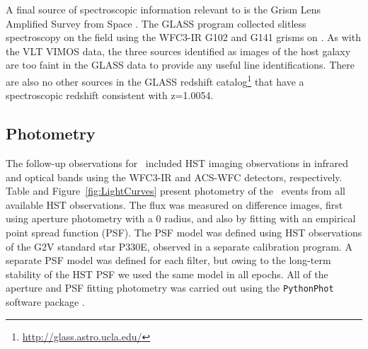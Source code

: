 A final source of spectroscopic information relevant to \spock
is the Grism Lens Amplified Survey from Space \citep[GLASS; PID:
  HST-GO-13459; PI:T. Treu][]{Schmidt:2014,Treu:2015a}. The GLASS
program collected slitless spectroscopy on the  field using
the WFC3-IR G102 and G141 grisms on \HST.  As with the VLT VIMOS data,
the three sources identified as images of the \spock host galaxy are
too faint in the GLASS data to provide any useful line
identifications.  There are also no other sources in the GLASS
redshift catalog\footnote{\url{http://glass.astro.ucla.edu/}} that
have a spectroscopic redshift consistent with z=1.0054.

\subsection{Photometry}\label{sec:Photometry}

The follow-up observations for \spock\ included HST imaging observations in
infrared and optical bands using the WFC3-IR and ACS-WFC detectors,
respectively. Table  %
and Figure~\ref{fig:LightCurves} present 
photometry of the \spock\ events
from all available HST observations. The flux was measured on
difference images, first using aperture photometry with a 0
radius, and also by fitting with an empirical point spread function
(PSF).  The PSF model was defined using HST observations of the G2V
standard star P330E, observed in a separate calibration program.  A
separate PSF model was defined for each filter, but owing to the
long-term stability of the HST PSF we used the same model in all
epochs.  All of the aperture and PSF fitting photometry was carried
out using the {\tt PythonPhot} software package \citep{Jones:2015}.

